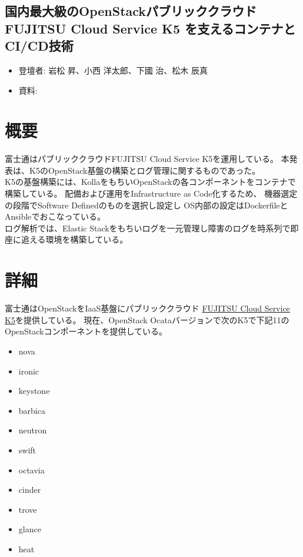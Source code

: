 \begin{center}
  \section*{国内最大級のOpenStackパブリッククラウド \\
    FUJITSU Cloud Service K5 を支えるコンテナとCI/CD技術}
\end{center}


\begin{flushright}
  \begin{itemize}
  \item   登壇者: 岩松 昇、小西 洋太郎、下國 治、松木 辰真
  \item 資料: 
  \end{itemize}
\end{flushright}

\section*{概要}

富士通はパブリッククラウドFUJITSU Cloud Service K5を運用している。
本発表は、K5のOpenStack基盤の構築とログ管理に関するものであった。\\

K5の基盤構築には、KollaをもちいOpenStackの各コンポーネントをコンテナで構築している。
配備および運用をInfrastructure as Code化するため、
機器選定の段階でSoftware Definedのものを選択し設定し
OS内部の設定はDockerfileとAnsibleでおこなっている。\\

ログ解析では、Elastic Stackをもちいログを一元管理し障害のログを時系列で即座に追える環境を構築している。

\section*{詳細}

富士通はOpenStackをIaaS基盤にパブリッククラウド \href{http://jp.fujitsu.com/solutions/cloud/k5/}{FUJITSU Cloud Service K5}を提供している。
現在、OpenStack Ocataバージョンで次のK5で下記11のOpenStackコンポーネントを提供している。

\begin{itemize}
\item nova
\item ironic
\item keystone
\item barbica
\item neutron
\item swift
\item octavia
\item cinder
\item trove
\item glance
\item heat
\end{itemize}


